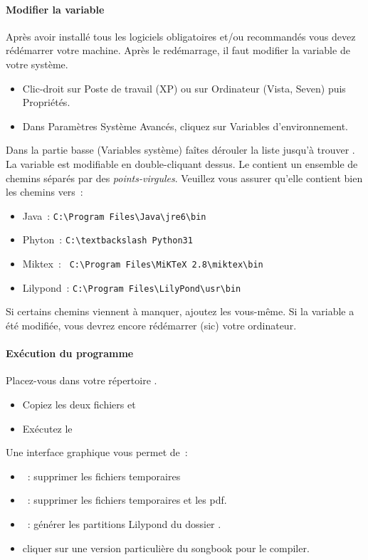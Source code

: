 \documentclass[online]{patacrep}
\begin{document}
\paragraph{Modifier la variable }
Après avoir installé tous les logiciels obligatoires et/ou recommandés
vous devez rédémarrer votre machine.  Après le redémarrage, il faut
modifier la variable  de votre système.
\begin{itemize}
\item Clic-droit sur Poste de travail (XP) ou sur Ordinateur (Vista,
  Seven) puis Propriétés.
\item Dans Paramètres Système Avancés, cliquez sur Variables
  d'environnement.
\end{itemize}

Dans la partie basse (Variables système) faîtes dérouler la liste
jusqu'à trouver . La variable est modifiable en
double-cliquant dessus. Le  contient un ensemble de
chemins séparés par des \emph{points-virgules}.  Veuillez vous assurer
qu'elle contient bien les chemins vers~:
\begin{itemize}
\item Java~: \verb#C:\Program Files\Java\jre6\bin#
\item Phyton~: \verb#C:\textbackslash Python31#
\item Miktex~: \verb# C:\Program Files\MiKTeX 2.8\miktex\bin#
\item Lilypond~: \verb#C:\Program Files\LilyPond\usr\bin#
\end{itemize}                     

Si certains chemins viennent à manquer, ajoutez les vous-même. Si la
variable a été modifiée, vous devrez encore rédémarrer (sic) votre
ordinateur.

\paragraph{Exécution du programme}
Placez-vous dans votre répertoire .
\begin{itemize}
\item Copiez les deux fichiers  et 
\item Exécutez le 
\end{itemize}

Une interface graphique vous permet de~:
\begin{itemize}
\item {}~: supprimer les fichiers temporaires
\item {}~: supprimer les fichiers temporaires et les
  pdf.
\item {}~: générer les partitions Lilypond du
  dossier .
\item cliquer sur une version particulière du songbook pour le
  compiler.
\end{itemize}
\end{document}
